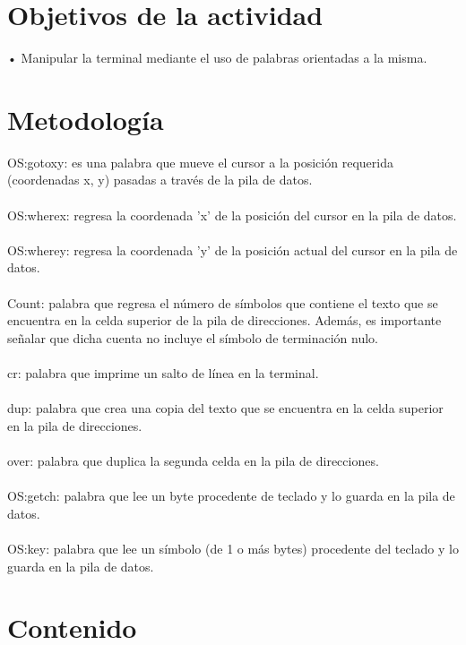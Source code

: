 \documentclass[conference]{IEEEtran}
\begin{document}
\section{Objetivos de la actividad}
\begin{center}
 • Manipular la terminal mediante el uso de palabras orientadas a la misma.
\end{center}

\section{Metodología}
OS:gotoxy: es una palabra que mueve el cursor a la posición requerida (coordenadas x, y) pasadas a través de la pila de datos. \\
\\OS:wherex: regresa la coordenada 'x' de la posición del cursor en la pila de datos. \\
\\OS:wherey: regresa la coordenada 'y' de la posición actual del cursor en la pila de datos. \\
\\Count: palabra que regresa el número de símbolos que contiene el texto que se encuentra en la celda superior de la pila de direcciones. Además, es importante señalar que dicha cuenta no incluye el símbolo de terminación nulo. \\
\\cr: palabra que imprime un salto de línea en la terminal. \\
\\dup: palabra que crea una copia del texto que se encuentra en la celda superior en la pila de direcciones. \\
\\over: palabra que duplica la segunda celda en la pila de direcciones. \\
\\OS:getch: palabra que lee un byte procedente de teclado y lo guarda en la pila de datos. \\
\\OS:key: palabra que lee un símbolo (de 1 o más bytes) procedente del teclado y lo guarda en la pila de datos. \\ 

\section{Contenido}
\end{document}
